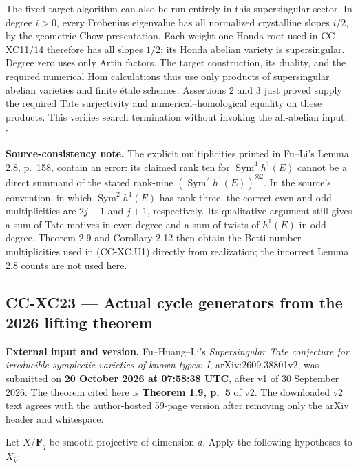 The fixed-target algorithm can also be run entirely in this
supersingular sector. In degree \(i>0\), every Frobenius eigenvalue has
all normalized crystalline slopes \(i/2\), by the geometric Chow
presentation. Each weight-one Honda root used in CC-XC11/14 therefore
has all slopes \(1/2\); its Honda abelian variety is supersingular.
Degree zero uses only Artin factors. The target construction, its
duality, and the required numerical Hom calculations thus use only
products of supersingular abelian varieties and finite étale schemes.
Assertions 2 and 3 just proved supply the required Tate surjectivity and
numerical--homological equality on these products. This verifies search
termination without invoking the all-abelian input. \(\square\)

\textbf{Source-consistency note.} The explicit multiplicities printed in
Fu--Li's Lemma 2.8, p.~158, contain an error: its claimed rank ten for
\(\operatorname{Sym}^4 h^1(E)\) cannot be a direct summand of the stated
rank-nine \((\operatorname{Sym}^2 h^1(E))^{\otimes2}\). In the source's
convention, in which \(\operatorname{Sym}^2 h^1(E)\) has rank three, the
correct even and odd multiplicities are \(2j+1\) and \(j+1\),
respectively. Its qualitative argument still gives a sum of Tate motives
in even degree and a sum of twists of \(h^1(E)\) in odd degree. Theorem
2.9 and Corollary 2.12 then obtain the Betti-number multiplicities used
in (CC-XC.U1) directly from realization; the incorrect Lemma 2.8 counts
are not used here.

\subsection{CC-XC23 --- Actual cycle generators from the 2026 lifting
theorem}\label{cc-xc23-actual-cycle-generators-from-the-2026-lifting-theorem}

\textbf{External input and version.} Fu--Huang--Li's \emph{Supersingular
Tate conjecture for irreducible symplectic varieties of known types: I},
arXiv:2609.38801v2, was submitted on \textbf{20 October 2026 at 07:58:38
UTC}, after v1 of 30 September 2026. The theorem cited here is
\textbf{Theorem 1.9, p.~5} of v2. The downloaded v2 text agrees with the
author-hosted 59-page version after removing only the arXiv header and
whitespace.

Let \(X/\mathbf F_q\) be smooth projective of dimension \(d\). Apply the
following hypotheses to \(X_{\bar k}\):


